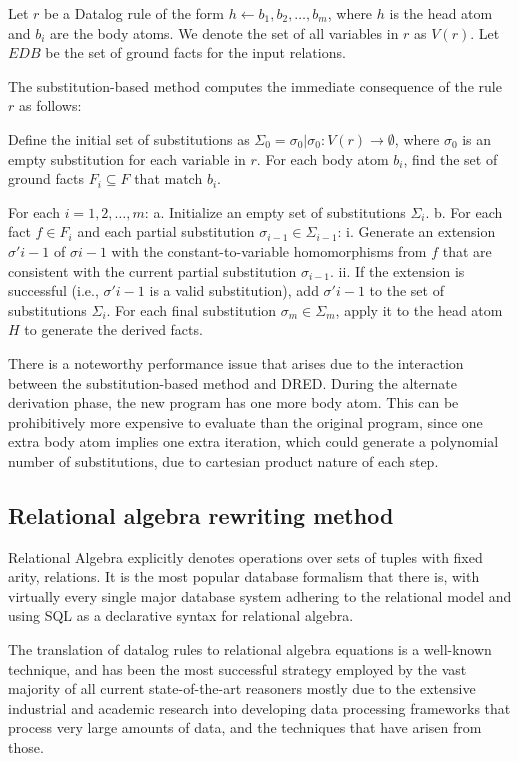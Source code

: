 \documentclass[sigconf,screen,review,natbib]{acmart}
\theoremstyle{definition}
\begin{document}
Let $r$ be a Datalog rule of the form $h \leftarrow b_1, b_2, \ldots, b_m$, where $h$ is the head atom and $b_i$ are
the body atoms. We denote the set of all variables in $r$ as $V(r)$. Let $EDB$ be the set of ground facts for the input
relations.

The substitution-based method computes the immediate consequence of the rule $r$ as follows:

Define the initial set of substitutions as $\Sigma_0 = {\sigma_0 | \sigma_0: V(r) \rightarrow \emptyset}$, where $\sigma_0$
is an empty substitution for each variable in $r$. For each body atom $b_i$, find the set of ground facts $F_i \subseteq F$
that match $b_i$.

For each $i = 1, 2, \ldots, m$:
a. Initialize an empty set of substitutions $\Sigma_{i}$.
b. For each fact $f \in F_i$ and each partial substitution $\sigma_{i-1} \in \Sigma_{i-1}$:
i. Generate an extension $\sigma'{i-1}$ of $\sigma{i-1}$ with the constant-to-variable homomorphisms from $f$ that are
consistent with the current partial substitution $\sigma_{i-1}$.
ii. If the extension is successful (i.e., $\sigma'{i-1}$ is a valid substitution), add $\sigma'{i-1}$ to the set of
substitutions $\Sigma_i$.
For each final substitution $\sigma_m \in \Sigma_m$, apply it to the head atom $H$ to generate the derived facts.

There is a noteworthy performance issue that arises due to the interaction between the substitution-based method
and DRED. During the alternate derivation phase, the new program has one more body atom. This can be prohibitively
more expensive to evaluate than the original program, since one extra body atom implies one extra iteration, which
could generate a polynomial number of substitutions, due to cartesian product nature of each step.

\subsection{Relational algebra rewriting method}
Relational Algebra\cite{codd_1970} explicitly denotes operations over sets of tuples with fixed
arity, relations. It is the most popular database formalism that there is, with virtually every single
major database system adhering to the relational model\cite{pg,mysql,sqlserver} and using SQL as a
declarative syntax for relational algebra.

The translation of datalog rules to relational algebra equations is a well-known technique, and has been
the most successful strategy employed by the vast majority of all current state-of-the-art reasoners\cite{bigdatalog, cog, nexus, recstep, dcdatalog, souffle}
mostly due to the extensive industrial and academic research into developing data processing frameworks
that process very large amounts of data, and the techniques that have arisen from those.
\end{document}
